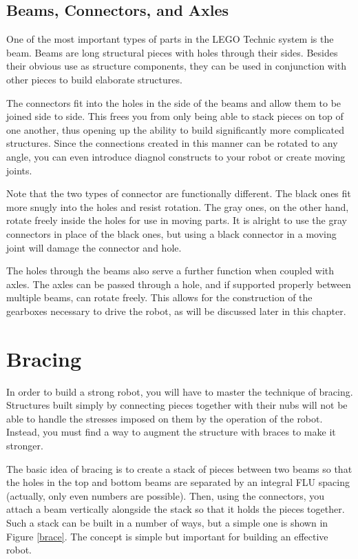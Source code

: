 \subsection{Beams, Connectors, and Axles}

One of the most important types of parts in the LEGO Technic system is
the beam.  Beams are long structural pieces with holes through their
sides.  Besides their obvious use as structure components, they can be
used in conjunction with other pieces to build elaborate structures.

The connectors fit into the holes in the side of the beams and allow
them to be joined side to side. This frees you from only being able to
stack pieces on top of one another, thus opening up the ability to
build significantly more complicated structures. Since the connections
created in this manner can be rotated to any angle, you can even
introduce diagnol constructs to your robot or create moving joints.

Note that the two types of connector are functionally different. The
black ones fit more snugly into the holes and resist rotation. The
gray ones, on the other hand, rotate freely inside the holes for use
in moving parts. It is alright to use the gray connectors in place of
the black ones, but using a black connector in a moving joint will
damage the connector and hole.

The holes through the beams also serve a further function when coupled
with axles.  The axles can be passed through a hole, and if supported
properly between multiple beams, can rotate freely.  This allows for
the construction of the gearboxes necessary to drive the robot, as
will be discussed later in this chapter.

\section{Bracing}

In order to build a strong robot, you will have to master the
technique of bracing. Structures built simply by connecting pieces
together with their nubs will not be able to handle the stresses
imposed on them by the operation of the robot. Instead, you must find
a way to augment the structure with braces to make it stronger.

The basic idea of bracing is to create a stack of pieces between two
beams so that the holes in the top and bottom beams are separated by
an integral FLU spacing (actually, only even numbers are
possible). Then, using the connectors, you attach a beam vertically
alongside the stack so that it holds the pieces together. Such a stack
can be built in a number of ways, but a simple one is shown in Figure
\ref{brace}. The concept is simple but important for building an
effective robot.


